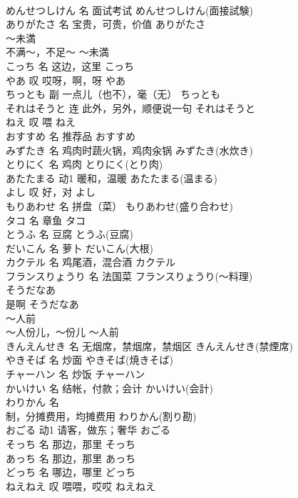 \documentclass[8pt]{extreport}
\begin{document}
\begin{CJK}{UTF8}{min}
\\	めんせつしけん	名	面试考试	めんせつしけん(面接試験)	
\\	ありがたさ	名	宝贵，可贵，价值	ありがたさ	
\\	～未満	
\\	不满～，不足～	～未満	
\\	こっち	名	这边，这里	こっち	
\\	やあ	叹	哎呀，啊，呀	やあ	
\\	ちっとも	副	一点儿（也不），毫（无）	ちっとも	
\\	それはそうと	连	此外，另外，顺便说一句	それはそうと	
\\	ねえ	叹	喂	ねえ	
\\	おすすめ	名	推荐品	おすすめ	
\\	みずたき	名	鸡肉时蔬火锅，鸡肉汆锅	みずたき(水炊き)	
\\	とりにく	名	鸡肉	とりにく(とり肉)	
\\	あたたまる	动1	暖和，温暖	あたたまる(温まる)	
\\	よし	叹	好，对	よし	
\\	もりあわせ	名	拼盘（菜）	もりあわせ(盛り合わせ)	
\\	タコ	名	章鱼	タコ	
\\	とうふ	名	豆腐	とうふ(豆腐)	
\\	だいこん	名	萝卜	だいこん(大根)	
\\	カクテル	名	鸡尾酒，混合酒	カクテル	
\\	フランスりょうり	名	法国菜	フランスりょうり(～料理)	
\\	そうだなあ	
\\	是啊	そうだなあ	
\\	～人前	
\\	～人份儿，～份儿	～人前	
\\	きんえんせき	名	无烟席，禁烟席，禁烟区	きんえんせき(禁煙席)	
\\	やきそば	名	炒面	やきそば(焼きそば)	
\\	チャーハン	名	炒饭	チャーハン	
\\	かいけい	名	结帐，付款；会计	かいけい(会計)	
\\	わりかん	名	
\\	制，分摊费用，均摊费用	わりかん(割り勘)	
\\	おごる	动1	请客，做东；奢华	おごる	
\\	そっち	名	那边，那里	そっち	
\\	あっち	名	那边，那里	あっち	
\\	どっち	名	哪边，哪里	どっち	
\\	ねえねえ	叹	喂喂，哎哎	ねえねえ	

\end{CJK}
\end{document}
